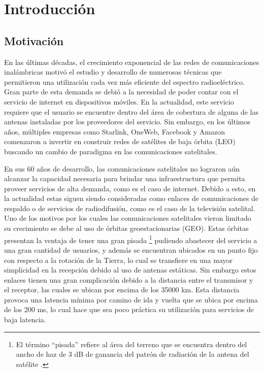 \chapter{Introducción}

\section{Motivación}

En las últimas décadas, el crecimiento exponencial de las redes de comunicaciones inalámbricas motivó el estudio y desarrollo de numerosas técnicas que permitieron una utilización cada vez más eficiente del espectro radioeléctrico. Gran parte de esta demanda se debió a la necesidad de poder contar con el servicio de internet en dispositivos móviles. En la actualidad, este servicio requiere que el usuario se encuentre dentro del área de cobertura de alguna de las antenas instaladas por los proveedores del servicio. Sin embargo, en los últimos años, múltiples empresas como Starlink, OneWeb, Facebook y Amazon \cite{bib:techcrunch} comenzaron a invertir en construir redes de satélites de baja órbita (LEO) buscando un cambio de paradigma en las comunicaciones satelitales.

En sus 60 años de desarrollo, las comunicaciones satelitales no lograron aún alcanzar la capacidad necesaria para brindar una infraestructura que permita proveer servicios de alta demanda, como es el caso de internet. Debido a esto, en la actualidad estas siguen siendo consideradas como enlaces de comunicaciones de respaldo o de servicios de radiodifusión, como es el caso de la televisión satelital. Uno de los motivos por los cuales las comunicaciones satelitales vieron limitado su crecimiento se debe al uso de órbitas geoestacionarias (GEO). Estas órbitas presentan la ventaja de tener una gran pisada \footnote{El término ``pisada'' refiere al área del terreno que se encuentra dentro del ancho de haz de 3 dB de ganancia del patrón de radiación de la antena del satélite \cite{bib:seangudi}.} pudiendo abastecer del servicio a una gran cantidad de usuarios, y además se encuentran ubicados en un punto fijo con respecto a la rotación de la Tierra, lo cual se transfiere en una mayor simplicidad en la recepción debido al uso de antenas estáticas. Sin embargo estos enlaces tienen una gran complicación debido a la distancia entre el transmisor y el receptor, las cuales se ubican por encima de los 35000 km. Esta distancia provoca una latencia mínima por camino de ida y vuelta que se ubica por encima de los 200 ms, lo cual hace que sea poco práctica su utilización para servicios de baja latencia.

